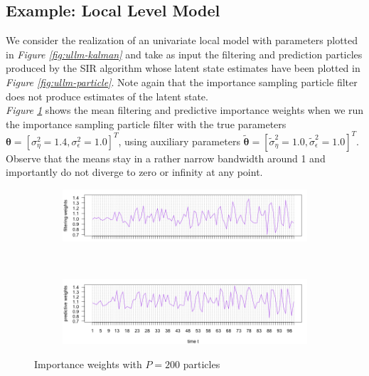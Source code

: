 \documentclass[11pt, oneside]{scrreprt}   	%
\begin{document}
\subsection{Example: Local Level Model}
We consider the realization of an univariate local model with parameters plotted in \textit{Figure \ref{fig:ullm-kalman}} and take as input the filtering and prediction particles produced by the SIR algorithm whose latent state estimates have been plotted in \textit{Figure \ref{fig:ullm-particle}}. Note again that the importance sampling particle filter does not produce estimates of the latent state.\\

\textit{Figure \ref{fig:ullm_is-particle}} shows the mean filtering and predictive importance weights when we run the importance sampling particle filter with the true parameters $\boldsymbol{\theta} = [\sigma_{\eta}^2=1.4, \sigma_{\epsilon}^2=1.0]^T$, using auxiliary parameters $\boldsymbol{\tilde{\theta}} = [\tilde{\sigma}_{\eta}^2=1.0, \tilde{\sigma}_{\epsilon}^2=1.0]^T$. Observe that the means stay in a rather narrow bandwidth around 1 and importantly do not diverge to zero or infinity at any point.

\begin{figure}[h!]
\centering
\begin{subfigure}{1\textwidth}
  \centering
  \includegraphics[width=150mm]{../../images/ullm_is_filt_weights_P200.png}
\end{subfigure}%
\\
\begin{subfigure}{1\textwidth}
  \centering
  \includegraphics[width=150mm]{../../images/ullm_is_pred_weights_P200.png}
\end{subfigure}
\caption{Importance weights with $P=200$ particles}
\label{fig:ullm_is-particle}
\end{figure}
\end{document}
